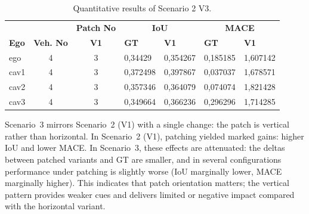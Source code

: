\begin{table}[H]
    \centering
    \caption{Quantitative results of Scenario 2 V3.}
    \label{tab:scenario2v3_results}
    \begin{tabularx}{\textwidth}{l c c *{4}{X}}
        \toprule
            &             &   \multicolumn{1}{c}{\textbf{Patch No}}  & \multicolumn{2}{c}{\textbf{IoU}} & \multicolumn{2}{c}{\textbf{MACE}}                            \\
        \cmidrule(lr){4-5}\cmidrule(lr){6-7}
        \textbf{Ego}           &
        \textbf{Veh. No}       &
        \textbf{V1}      &
        \textbf{GT}            & \textbf{V1}  &
        \textbf{GT}            & \textbf{V1}  \\
        \midrule
        ego         & 4  & 3 & 0,34429 & 0,354267 & 0,185185 & 1,607142 \\
        cav1        & 4  & 3 & 0,372498 & 0,397867 & 0,037037 & 1,678571 \\
        cav2        & 4  & 3 & 0,357346 & 0,364079 & 0,074074 & 1,821428 \\
        cav3        & 4  & 3 & 0,349664 & 0,366236 & 0,296296 & 1,714285 \\
        \bottomrule
    \end{tabularx}
\end{table}

Scenario~3 mirrors Scenario~2 (V1) with a single change: the patch is vertical rather than horizontal. 
In Scenario~2 (V1), patching yielded marked gains: higher IoU and lower MACE. 
In Scenario~3, these effects are attenuated: the deltas between patched variants and GT are smaller, and in several configurations performance under patching is slightly worse (IoU marginally lower, MACE marginally higher). 
This indicates that patch orientation matters; the vertical pattern provides weaker cues and delivers limited or negative impact compared with the horizontal variant.

